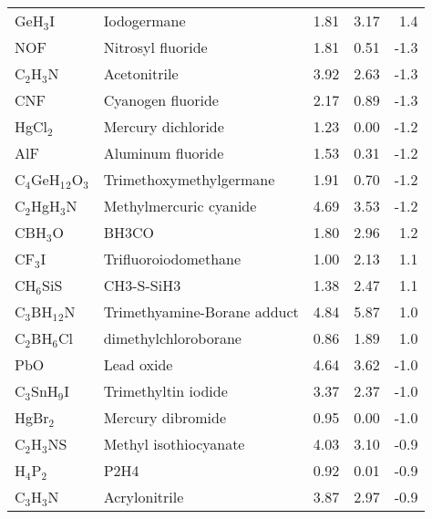 \begin{table}
\begin{center}
\begin{tabular}{llrrr}
 GeH$_3$I             & Iodogermane                            &    1.81   &     3.17   &    1.4\\
 NOF                  & Nitrosyl fluoride                      &    1.81   &     0.51   &   -1.3\\
 C$_2$H$_3$N          & Acetonitrile                           &    3.92   &     2.63   &   -1.3\\
 CNF                  & Cyanogen fluoride                      &    2.17   &     0.89   &   -1.3\\
 HgCl$_2$             & Mercury dichloride                     &    1.23   &     0.00   &   -1.2\\
 AlF                  & Aluminum fluoride                      &    1.53   &     0.31   &   -1.2\\
 C$_4$GeH$_1$$_2$O$_3$ & Trimethoxymethylgermane                &    1.91   &     0.70   &   -1.2\\
 C$_2$HgH$_3$N        & Methylmercuric cyanide                 &    4.69   &     3.53   &   -1.2\\
 CBH$_3$O             & BH3CO                                  &    1.80   &     2.96   &    1.2\\
 CF$_3$I              & Trifluoroiodomethane                   &    1.00   &     2.13   &    1.1\\
 CH$_6$SiS            & CH3-S-SiH3                             &    1.38   &     2.47   &    1.1\\
 C$_3$BH$_1$$_2$N     & Trimethyamine-Borane adduct            &    4.84   &     5.87   &    1.0\\
 C$_2$BH$_6$Cl        & dimethylchloroborane                   &    0.86   &     1.89   &    1.0\\
 PbO                  & Lead oxide                             &    4.64   &     3.62   &   -1.0\\
 C$_3$SnH$_9$I        & Trimethyltin iodide                    &    3.37   &     2.37   &   -1.0\\
 HgBr$_2$             & Mercury dibromide                      &    0.95   &     0.00   &   -1.0\\
 C$_2$H$_3$NS         & Methyl isothiocyanate                  &    4.03   &     3.10   &   -0.9\\
 H$_4$P$_2$           & P2H4                                   &    0.92   &     0.01   &   -0.9\\
 C$_3$H$_3$N          & Acrylonitrile                          &    3.87   &     2.97   &   -0.9\\

\end{tabular}
\end{center}
\end{table}
